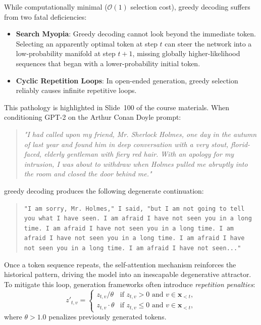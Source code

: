 \documentclass[../../main.tex]{subfiles}
\begin{document}
While computationally minimal ($\mathcal{O}(1)$ selection cost), greedy decoding suffers from two fatal deficiencies:
\begin{itemize}
    \item \textbf{Search Myopia}: Greedy decoding cannot look beyond the immediate token. Selecting an apparently optimal token at step $t$ can steer the network into a low-probability manifold at step $t+1$, missing globally higher-likelihood sequences that began with a lower-probability initial token.
    \item \textbf{Cyclic Repetition Loops}: In open-ended generation, greedy selection reliably causes infinite repetitive loops.
\end{itemize}

This pathology is highlighted in Slide~100 of the course materials. When conditioning GPT-2 on the Arthur Conan Doyle prompt:
\begin{quote}
\emph{"I had called upon my friend, Mr. Sherlock Holmes, one day in the autumn of last year and found him in deep conversation with a very stout, florid-faced, elderly gentleman with fiery red hair. With an apology for my intrusion, I was about to withdraw when Holmes pulled me abruptly into the room and closed the door behind me."}
\end{quote}
greedy decoding produces the following degenerate continuation:
\begin{quote}
\texttt{"I am sorry, Mr. Holmes," I said, "but I am not going to tell you what I have seen. I am afraid I have not seen you in a long time. I am afraid I have not seen you in a long time. I am afraid I have not seen you in a long time. I am afraid I have not seen you in a long time. I am afraid I have not seen..."}
\end{quote}

Once a token sequence repeats, the self-attention mechanism reinforces the historical pattern, driving the model into an inescapable degenerative attractor. To mitigate this loop, generation frameworks often introduce \emph{repetition penalties}:
\begin{equation}
z'_{t,v} = \begin{cases}
z_{t,v} / \theta & \text{if } z_{t,v} > 0 \text{ and } v \in \mathbf{x}_{<t}, \\
z_{t,v} \cdot \theta & \text{if } z_{t,v} \le 0 \text{ and } v \in \mathbf{x}_{<t},
\end{cases}
\label{eq:repetition_penalty_formula}
\end{equation}
where $\theta > 1.0$ penalizes previously generated tokens.
\end{document}
